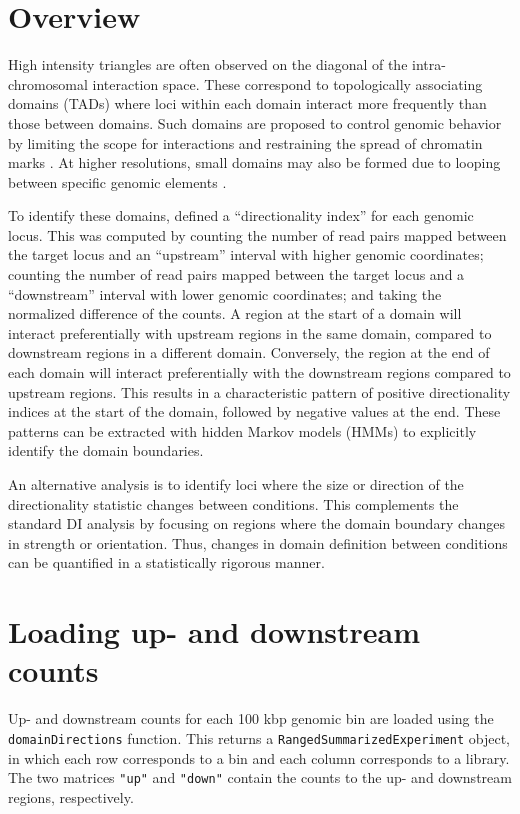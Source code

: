 \documentclass[12pt]{report}
\newcommand{\code}[1]{{\small\texttt{#1}}}
\begin{document}
\section{Overview}
High intensity triangles are often observed on the diagonal of the intra-chromosomal interaction space.
These correspond to topologically associating domains (TADs) where loci within each domain interact more frequently than those between domains.
Such domains are proposed to control genomic behavior by limiting the scope for interactions and restraining the spread of chromatin marks \citep{nora2013segmental}.
At higher resolutions, small domains may also be formed due to looping between specific genomic elements \citep{rao2014kilobase}.

To identify these domains, \cite{dixon2012topological} defined a ``directionality index'' for each genomic locus.
This was computed by counting the number of read pairs mapped between the target locus and an ``upstream'' interval with higher genomic coordinates;
    counting the number of read pairs mapped between the target locus and a ``downstream'' interval with lower genomic coordinates;
    and taking the normalized difference of the counts.
A region at the start of a domain will interact preferentially with upstream regions in the same domain, compared to downstream regions in a different domain.
Conversely, the region at the end of each domain will interact preferentially with the downstream regions compared to upstream regions.
This results in a characteristic pattern of positive directionality indices at the start of the domain, followed by negative values at the end.
These patterns can be extracted with hidden Markov models (HMMs) to explicitly identify the domain boundaries.

An alternative analysis is to identify loci where the size or direction of the directionality statistic changes between conditions.
This complements the standard DI analysis by focusing on regions where the domain boundary changes in strength or orientation.
Thus, changes in domain definition between conditions can be quantified in a statistically rigorous manner.

\section{Loading up- and downstream counts}
Up- and downstream counts for each 100 kbp genomic bin are loaded using the \code{domainDirections} function.
This returns a \code{RangedSummarizedExperiment} object, in which each row corresponds to a bin and each column corresponds to a library.
The two matrices \code{"up"} and \code{"down"} contain the counts to the up- and downstream regions, respectively.
\end{document}
